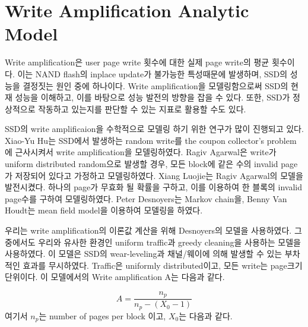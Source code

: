 \documentclass[letterpaper,twocolumn,10pt]{article}
\begin{document}
\section{Write Amplification Analytic Model}
\label{sec:WA_model}


Write amplification은 user page write 횟수에 대한 실제 page write의 평균 횟수이다.
이는 NAND flash의 inplace update가 불가능한 특성때문에 발생하며, SSD의 성능을 결정짓는 원인 중에 하나이다. 
Write amplification을 모델링함으로써 SSD의 현재 성능을 이해하고, 이를 바탕으로 성능 발전의 방향을 잡을 수 있다.
또한, SSD가 정상적으로 작동하고 있는지를 판단할 수 있는 지표로 활용할 수도 있다.


SSD의 write amplificaion을 수학적으로 모델링 하기 위한 연구가 많이 진행되고 있다. 
Xiao-Yu Hu\cite{Hu:2009:WAA:1534530.1534544}\cite{Hu:2010:RZ3771}는 SSD에서 발생하는 random write를 the coupon collector's problem에 근사시켜서 write amplification을 모델링하였다. 
Ragiv Agarwal\cite{Agarwal5700261}은 write가 uniform distributed random으로 발생할 경우, 모든 block에 같은 수의 invalid page가 저장되어 있다고 가정하고 모델링하였다.
Xiang Luojie\cite{Luojie6167472}는 Ragiv Agarwal의 모델을 발전시켰다.
하나의 page가 무효화 될 확률을 구하고, 이를 이용하여 한 블록의 invalid page수를 구하여 모델링하였다.
Peter Desnoyers\cite{Desnoyers:2012:AMS:2367589.2367603}는 Markov chain을, Benny Van Houdt\cite{VanHoudt2013}는 mean field model을 이용하여 모델링을 하였다.


우리는 write amplification의 이론값 계산을 위해 Desnoyers\cite{Desnoyers:2012:AMS:2367589.2367603}의 모델을 사용하였다.
그 중에서도 우리와 유사한 환경인 uniform traffic과 greedy cleaning을 사용하는 모델을 사용하였다.
이 모델은 SSD의 wear-leveling과 채널/웨이에 의해 발생할 수 있는 부차적인 효과를 무시하였다.
Traffic은 uniformly distributed이고, 모든 write는 page크기 단위이다.
이 모델에서의 Write amplification A는 다음과 같다.


\begin{equation}
\label{analy_grd_unif_wa}
A=\frac{n_p}{n_p-(X_0-1)}
\end{equation}
여기서 $n_p$는 number of pages per block 이고, $X_0$는 다음과 같다.

\end{document}
